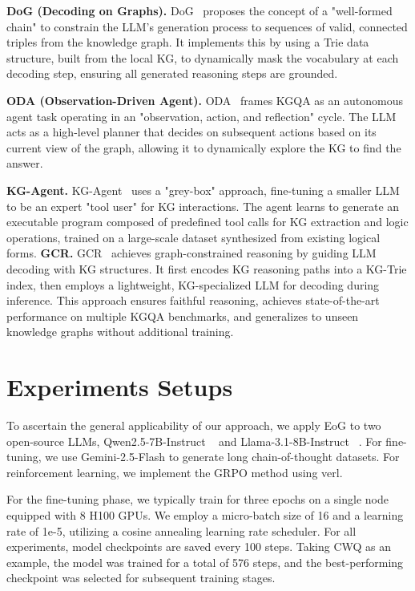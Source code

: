 \textbf{DoG (Decoding on Graphs).}
DoG~\citep{li-etal-2025-decoding-graphs} proposes the concept of a "well-formed chain" to constrain the LLM's generation process to sequences of valid, connected triples from the knowledge graph. It implements this by using a Trie data structure, built from the local KG, to dynamically mask the vocabulary at each decoding step, ensuring all generated reasoning steps are grounded.


\textbf{ODA (Observation-Driven Agent).}
ODA~\citep{sun-etal-2024-oda} frames KGQA as an autonomous agent task operating in an "observation, action, and reflection" cycle. The LLM acts as a high-level planner that decides on subsequent actions based on its current view of the graph, allowing it to dynamically explore the KG to find the answer. 

\textbf{KG-Agent.}
KG-Agent~\citep{jiang-etal-2025-kg} uses a "grey-box" approach, fine-tuning a smaller LLM to be an expert "tool user" for KG interactions. The agent learns to generate an executable program composed of predefined tool calls for KG extraction and logic operations, trained on a large-scale dataset synthesized from existing logical forms.
\textbf{GCR.}
GCR~\citep{luo2024graph} achieves graph-constrained reasoning by guiding LLM decoding with KG structures. It first encodes KG reasoning paths into a KG-Trie index, then employs a lightweight, KG-specialized LLM for decoding during inference. This approach ensures faithful reasoning, achieves state-of-the-art performance on multiple KGQA benchmarks, and generalizes to unseen knowledge graphs without additional training.

\section{Experiments Setups}
\label{experiment}
To ascertain the general applicability of our approach, we apply EoG to two open-source LLMs, Qwen2.5-7B-Instruct ~\citep{yang2024qwen2technicalreport} and Llama-3.1-8B-Instruct ~\citep{dubey2024llama}. For fine-tuning, we use Gemini-2.5-Flash to generate long chain-of-thought datasets. For reinforcement learning, we implement the GRPO method using verl.

For the fine-tuning phase, we typically train for three epochs on a single node equipped with 8 H100 GPUs. We employ a micro-batch size of 16 and a learning rate of 1e-5, utilizing a cosine annealing learning rate scheduler. For all experiments, model checkpoints are saved every 100 steps. Taking CWQ as an example, the model was trained for a total of 576 steps, and the best-performing checkpoint was selected for subsequent training stages.



